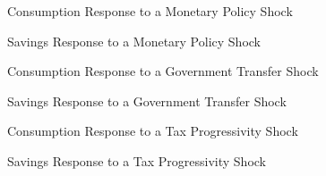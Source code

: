 \begin{figure}[ht]
    \centering
    \caption{Consumption Response to a Monetary Policy Shock}
    
\end{figure}

\begin{figure}[ht]
    \centering
    \caption{Savings Response to a Monetary Policy Shock}
    
\end{figure}

\begin{figure}[ht]
    \centering
    \caption{Consumption Response to a Government Transfer Shock}
    
\end{figure}

\begin{figure}[ht]
    \centering
    \caption{Savings Response to a Government Transfer Shock}
    
\end{figure}

\begin{figure}[ht]
    \centering
    \caption{Consumption Response to a Tax Progressivity Shock}
    
\end{figure}

\begin{figure}[ht]
    \centering
    \caption{Savings Response to a Tax Progressivity Shock}
    
\end{figure}

